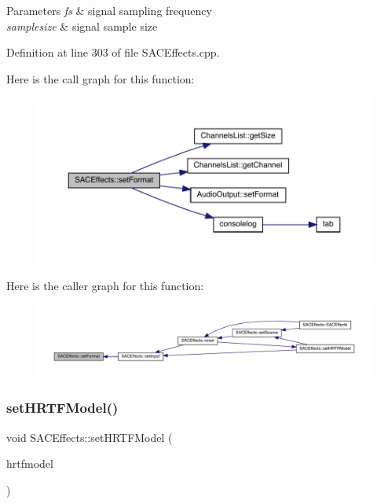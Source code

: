 \begin{DoxyParams}{Parameters}
{\em fs} & signal sampling frequency \\
\hline
{\em samplesize} & signal sample size \\
\hline
\end{DoxyParams}


Definition at line 303 of file S\+A\+C\+Effects.\+cpp.

Here is the call graph for this function\+:
\nopagebreak
\begin{figure}[H]
\begin{center}
\leavevmode
\includegraphics[width=350pt]{class_s_a_c_effects_a3d06db323bc9a3a1bbfe810f2a30d10f_cgraph}
\end{center}
\end{figure}
Here is the caller graph for this function\+:
\nopagebreak
\begin{figure}[H]
\begin{center}
\leavevmode
\includegraphics[width=350pt]{class_s_a_c_effects_a3d06db323bc9a3a1bbfe810f2a30d10f_icgraph}
\end{center}
\end{figure}
\mbox{\label{class_s_a_c_effects_a9af83c6a63fcdf10e4bd849fa3c5973c}} 
\subsubsection{\texorpdfstring{set\+H\+R\+T\+F\+Model()}{setHRTFModel()}}
{\footnotesize\ttfamily void S\+A\+C\+Effects\+::set\+H\+R\+T\+F\+Model (\begin{DoxyParamCaption}\item[{\hyperlink{struct_h_r_t_f_model_ae01efd7375e498a14624bbeebb93fa82}{H\+R\+T\+F\+Model\+::hrtfmodel}}]{hrtfmodel }\end{DoxyParamCaption})}


